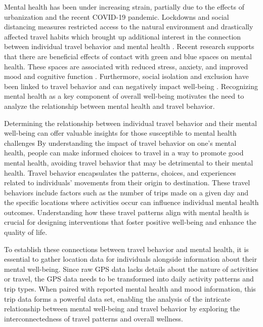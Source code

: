 \documentclass[
  letterpaper,
  authoryear]{elsarticle}
\begin{document}
Mental health has been under increasing strain, partially due to the
effects of urbanization and the recent COVID-19 pandemic. Lockdowns and
social distancing measures restricted access to the natural environment
and drastically affected travel habits which brought up additional
interest in the connection between individual travel behavior and mental
health \citep{pousoContactBluegreenSpaces2021}. Recent research supports
that there are beneficial effects of contact with green and blue spaces
on mental health. These spaces are associated with reduced stress,
anxiety, and improved mood and cognitive function
\citep{pousoContactBluegreenSpaces2021, whiteAssociationsGreenBlue2021}.
Furthermore, social isolation and exclusion have been linked to travel
behavior and can negatively impact well-being
\citep{delboscExploringRelativeInfluences2011, stanleyMobilitySocialExclusion2011}.
Recognizing mental health as a key component of overall well-being
motivates the need to analyze the relationship between mental health and
travel behavior.~

Determining the relationship between individual travel behavior and
their mental well-being can offer valuable insights for those
susceptible to mental health challenges By understanding the impact of
travel behavior on one's mental health, people can make informed choices
to travel in a way to promote good mental health, avoiding travel
behavior that may be detrimental to their mental health. Travel behavior
encapsulates the patterns, choices, and experiences related to
individuals' movements from their origin to destination. These travel
behaviors include factors such as the number of trips made on a given
day and the specific locations where activities occur can influence
individual mental health outcomes. Understanding how these travel
patterns align with mental health is crucial for designing interventions
that foster positive well-being and enhance the quality of life.~

To establish these connections between travel behavior and mental
health, it is essential to gather location data for individuals
alongside information about their mental well-being. Since raw GPS data
lacks details about the nature of activities or travel, the GPS data
needs to be transformed into daily activity patterns and trip types.
When paired with reported mental health and mood information, this trip
data forms a powerful data set, enabling the analysis of the intricate
relationship between mental well-being and travel behavior by exploring
the interconnectedness of travel patterns and overall wellness.
\end{document}
